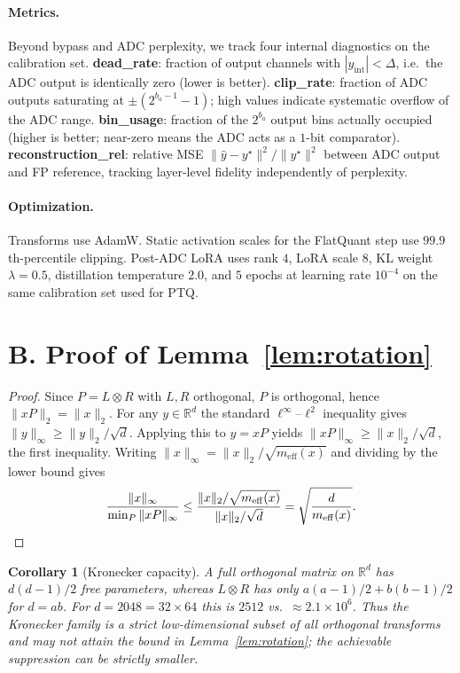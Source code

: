 \documentclass[letterpaper]{article} %
\theoremstyle{plain}
\newtheorem{corollary}{Corollary}
\begin{document}
\paragraph{Metrics.}
Beyond bypass and ADC perplexity, we track four internal diagnostics on the calibration set. \textbf{dead\_rate}: fraction of output channels with $|y_{\mathrm{int}}| < \Delta$, i.e.\ the ADC output is identically zero (lower is better). \textbf{clip\_rate}: fraction of ADC outputs saturating at $\pm(2^{b_a-1}-1)$; high values indicate systematic overflow of the ADC range. \textbf{bin\_usage}: fraction of the $2^{b_a}$ output bins actually occupied (higher is better; near-zero means the ADC acts as a $1$-bit comparator). \textbf{reconstruction\_rel}: relative MSE $\|\hat{y}-y^\star\|^2/\|y^\star\|^2$ between ADC output and FP reference, tracking layer-level fidelity independently of perplexity.

\paragraph{Optimization.}
Transforms use AdamW. Static activation scales for the FlatQuant step use $99.9$th-percentile clipping. Post-ADC LoRA uses rank $4$, LoRA scale $8$, KL weight $\lambda = 0.5$, distillation temperature $2.0$, and $5$ epochs at learning rate $10^{-4}$ on the same calibration set used for PTQ.

\section{B. Proof of Lemma~\ref{lem:rotation}}

\begin{proof}
Since $P = L \otimes R$ with $L, R$ orthogonal, $P$ is orthogonal, hence $\|xP\|_2 = \|x\|_2$. For any $y \in \mathbb{R}^d$ the standard $\ell^\infty$--$\ell^2$ inequality gives $\|y\|_\infty \ge \|y\|_2/\sqrt{d}$. Applying this to $y = xP$ yields $\|xP\|_\infty \ge \|x\|_2/\sqrt{d}$, the first inequality. Writing $\|x\|_\infty = \|x\|_2/\sqrt{m_{\mathrm{eff}}(x)}$ and dividing by the lower bound gives
\[
    \frac{\|x\|_\infty}{\min_P \|xP\|_\infty} \le \frac{\|x\|_2/\sqrt{m_{\mathrm{eff}}(x)}}{\|x\|_2/\sqrt{d}} = \sqrt{\frac{d}{m_{\mathrm{eff}}(x)}} . \qedhere
\]
\end{proof}

\begin{corollary}[Kronecker capacity]
\label{cor:capacity}
A full orthogonal matrix on $\mathbb{R}^d$ has $d(d-1)/2$ free parameters, whereas $L \otimes R$ has only $a(a-1)/2 + b(b-1)/2$ for $d = ab$. For $d = 2048 = 32 \times 64$ this is $2512$ vs.\ $\approx 2.1 \times 10^6$. Thus the Kronecker family is a strict low-dimensional subset of all orthogonal transforms and may not attain the bound in Lemma~\ref{lem:rotation}; the achievable suppression can be strictly smaller.
\end{corollary}
\end{document}
